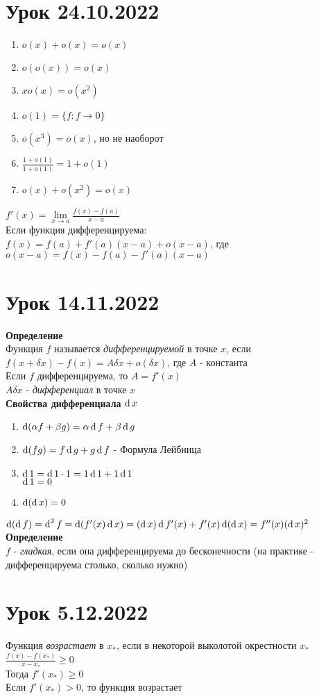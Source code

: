 \documentclass[12pt]{article}
\begin{document}
\section{Урок 24.10.2022}
\begin{enumerate}
    \item $o(x)+o(x)=o(x)$
    \item $o(o(x)) = o(x)$
    \item $xo(x) = o(x^2)$
    \item $o(1) = \{f: f \rightarrow 0\}$
    \item $o(x^3) = o(x)$, но не наоборот
    \item $\frac{1+o(1)}{1+o(1)} = 1+o(1)$
    \item $o(x)+o(x^2) = o(x)$
\end{enumerate}
$f'(x) = \lim\limits_{x\rightarrow a} \frac{f(x)-f(a)}{x-a}$\\
Если функция дифференцируема:\\
$f(x) = f(a) + f'(a)(x-a) + o(x-a)$, где $o(x-a) = f(x)-f(a)-f'(a)(x-a)$
\section{Урок 14.11.2022}
\textbf{Определение}\\
Функция $f$ называется \textit{дифференцируемой} в точке $x$, если $f(x+\delta x) - f(x) = A\delta x +o(\delta x)$, где $A$ - константа\\
Если $f$ дифференцируема, то $A = f'(x)$\\
$A\delta x$ - \textit{дифференциал} в точке $x$\\
\textbf{Свойства дифференциала $\operatorname{d} x$}
\begin{enumerate}
    \item $\operatorname{d} (\alpha f + \beta g) = \alpha \operatorname{d} f + \beta \operatorname{d} g$
    \item $\operatorname{d} (fg) = f\operatorname{d} g + g \operatorname{d} f$ - Формула Лейбница
    \item $\operatorname{d} 1 = \operatorname{d} 1\cdot1 = 1\operatorname{d} 1 + 1\operatorname{d} 1$\\
    $\operatorname{d} 1 = 0$
    \item $\operatorname{d} (\operatorname{d} x) = 0$
\end{enumerate}
$\operatorname{d} (\operatorname{d} f) = \operatorname{d}^2 f = \operatorname{d} (f'(x)\operatorname{d} x) = (\operatorname{d} x)\operatorname{d} f'(x) + f'(x) \operatorname{d} (\operatorname{d} x) = f''(x)(\operatorname{d} x)^2$\\
\textbf{Определение}\\
$f$ - \textit{гладкая}, если она дифференцируема до бесконечности (на практике - дифференцируема столько, сколько нужно)
\section{Урок 5.12.2022}
Функция \textit{возрастает} в $x_*$, если в некоторой выколотой окрестности $x_*$ $\frac{f(x)-f(x_*)}{x-x_*} \geq0$\\
Тогда $f'(x_*) \geq 0$\\
Если $f'(x_*) > 0$, то функция возрастает\\\\
\end{document}
